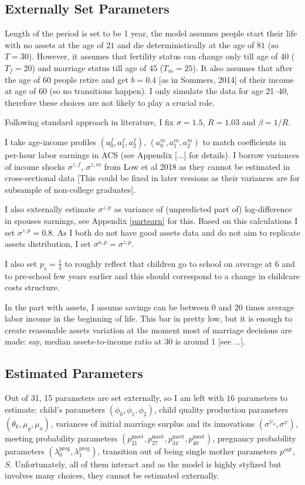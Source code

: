\documentclass[12pt,letter]{article}
\begin{document}
\subsection{Externally Set Parameters}
Length of the period is set to be 1 year, the model assumes people start their life with no assets at the age of $21$ and die deterministically at the age of $81$ (so $T = 30$). However, it assumes that fertility status can change only till age of 40 ($T_f = 20$) and marriage status till age of 45 ($T_m = 25$). It also assumes that after the age of 60 people retire and get $b = 0.4$ [as in Sommers, 2014] of their income at age of 60 (so no transitions happen). I only simulate the data for age 21--40, therefore these choices are not likely to play a crucial role. 

Following standard approach in literature, I fix $\sigma = 1.5$, $R = 1.03$ and $\beta = 1/R$. %

I take age-income profiles  $(a^f_0,a^f_1,a^f_2)$, $(a^m_0,a^m_1,a^m_2)$ to match coefficients in per-hour labor earnings in ACS (see Appendix [...] for details). I borrow variances of income shocks $\sigma^{z,f}$, $\sigma^{z,m}$ from Low et al 2018 as they cannot be estimated in cross-sectional data [This could be fixed in later versions as their variances are for subsample of non-college graduates]. 

I also externally estimate $\sigma^{z,p}$ as variance of (unpredicted part of) log-difference in spouses earnings, see Appendix \ref{partearn} for this. Based on this calculations I set $\sigma^{z,p} = 0.8$. As I both do not have good assets data and do not aim to replicate assets distribution, I set $\sigma^{a,p} = \sigma^{z,p}$.

I also set $p_s = \frac14$ to roughly reflect that children go to school on average at 6 and to pre-school few years earlier and this should correspond to a change in childcare costs structure.

In the part with assets, I assume savings can be between 0 and 20 times average labor income in the beginning of life. This bar in pretty low, but it is enough to create reasonable assets variation at the moment most of marriage decisions are made: say, median assets-to-income ratio at 30 is around 1 [see ...]. 

\subsection{Estimated Parameters}
Out of 31, 15 parameters are set externally, so I am left with $16$ parameters to estimate: child's parameters $(\phi_0,\phi_1,\phi_2)$, child quality production parameters $(\theta_k,\mu_y,\mu_a)$, variances of initial marriage surplus and its innovations $(\sigma^{\psi_0},\sigma^{\psi})$, meeting probability parameters $(p^{\text{meet}}_{21},p^{\text{meet}}_{27},p^{\text{meet}}_{34},p^{\text{meet}}_{40})$, pregnancy probability parameters $(\lambda^{\text{preg}}_0,\lambda^{\text{preg}}_1)$, transition out of being single mother parameters $p^{\text{out}}$, $S$. Unfortunately, all of them interact and as the model is highly stylized but involves many choices, they cannot be estimated externally. 
\end{document}
